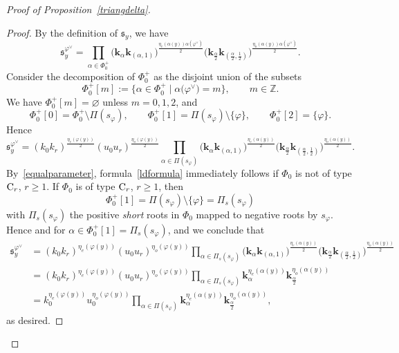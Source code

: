 \documentclass[pdftex]{sigma}
\numberwithin{equation}{section}
\begin{document}
\begin{proof}[Proof of Proposition~\ref{triangdelta}]
\begin{proof}
By the definition of $\mathfrak{s}_y$, we have
\[
\mathfrak{s}_y^{\varphi^\vee}=\prod_{\alpha\in\Phi_0^+}\bigl(\mathbf{k}_\alpha\mathbf{k}_{(\alpha,1)}\bigr)^{\frac{\eta_e(\alpha(y))\alpha(\varphi^\vee)}{2}}
\bigl(\mathbf{k}_{\frac{\alpha}{2}}\mathbf{k}_{(\frac{\alpha}{2},\frac{1}{2})}\bigr)^{\frac{\eta_o(\alpha(y))\alpha(\varphi^\vee)}{2}}.
\]
Consider the decomposition of $\Phi_0^+$ as the disjoint union of the subsets
\[
\Phi_0^+[m]:=\bigl\{\alpha\in\Phi_0^+ \mid \alpha\bigl(\varphi^\vee\bigr)=m\bigr\},\qquad m\in\mathbb{Z}.
\]
We have $\Phi_0^+[m]=\varnothing$ unless $m=0,1,2$, and
\[
\Phi_0^+[0]=\Phi_0^+\setminus\Pi(s_\varphi),\qquad \Phi_0^+[1]=\Pi(s_\varphi)\setminus\{\varphi\},\qquad \Phi_0^+[2]=\{\varphi\}.
\]
Hence
\[
\mathfrak{s}_y^{\varphi^\vee}=(k_0k_r)^{\frac{\eta_e(\varphi(y))}{2}}(u_0u_r)^{\frac{\eta_o(\varphi(y))}{2}}
\prod_{\alpha\in\Pi(s_\varphi)}\bigl(\mathbf{k}_\alpha\mathbf{k}_{(\alpha,1)}\bigr)^{\frac{\eta_e(\alpha(y))}{2}}
\bigl(\mathbf{k}_{\frac{\alpha}{2}}\mathbf{k}_{(\frac{\alpha}{2},\frac{1}{2})}\bigr)^{\frac{\eta_o(\alpha(y))}{2}}.
\]
By~\eqref{equalparameter}, formula~\eqref{ldformula} immediately follows if $\Phi_0$ is not of type ${\rm C}_r$, $r\geq 1$. If
$\Phi_0$ is of type ${\rm C}_r$, $r\geq 1$, then
\[
\Phi_0^+[1]=\Pi(s_\varphi)\setminus\{\varphi\}=\Pi_s(s_\varphi)
\]
with $\Pi_s(s_\varphi)$ the positive {\it short} roots in $\Phi_0$ mapped to
negative roots by $s_\varphi$. Hence  and 
for $\alpha\in\Phi_0^+[1]=\Pi_s(s_\varphi)$, and we conclude that
\begin{align*}
\mathfrak{s}_y^{\varphi^\vee}&=(k_0k_r)^{\eta_e(\varphi(y))}(u_0u_r)^{\eta_o(\varphi(y))}
\prod_{\alpha\in\Pi_s(s_\varphi)}\bigl(\mathbf{k}_\alpha\mathbf{k}_{(\alpha,1)}\bigr)^{\frac{\eta_e(\alpha(y))}{2}}
\bigl(\mathbf{k}_{\frac{\alpha}{2}}\mathbf{k}_{(\frac{\alpha}{2},\frac{1}{2})}\bigr)^{\frac{\eta_o(\alpha(y))}{2}}\\
&=(k_0k_r)^{\eta_e(\varphi(y))}(u_0u_r)^{\eta_o(\varphi(y))}
\prod_{\alpha\in\Pi_s(s_\varphi)}\mathbf{k}_\alpha^{\eta_e(\alpha(y))}\mathbf{k}_{\frac{\alpha}{2}}^{\eta_o(\alpha(y))}\\
&=k_0^{\eta_e(\varphi(y))}u_0^{\eta_o(\varphi(y))}
\prod_{\alpha\in\Pi(s_\varphi)}\mathbf{k}_\alpha^{\eta_e(\alpha(y))}\mathbf{k}_{\frac{\alpha}{2}}^{\eta_o(\alpha(y))},
\end{align*}
as desired.
\end{proof}


\end{proof}
\end{document}
